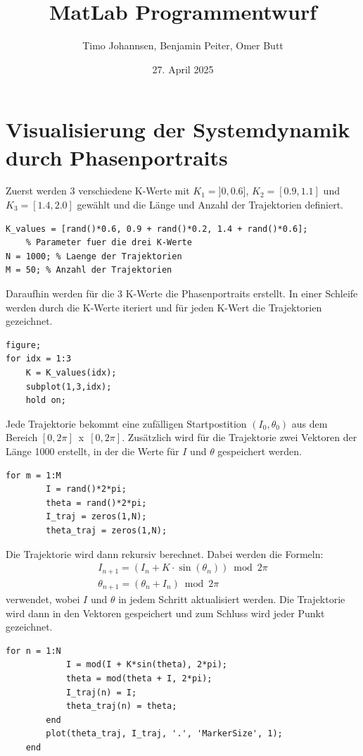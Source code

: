 \documentclass[paper=a4, 
                DIV=12]{scrartcl}
\title{MatLab Programmentwurf}
\author{Timo Johannsen, Benjamin Peiter, Omer Butt}
\date{27. April 2025}
\begin{document}
\maketitle
\newpage
\tableofcontents
\newpage

\section{Visualisierung der Systemdynamik durch Phasenportraits}
Zuerst werden 3 verschiedene K-Werte mit $K_{1} = ]0,0.6]$, $K_{2} = [0.9,1.1]$ und \hbox{$K_{3} = [1.4,2.0]$} gewählt und die Länge und Anzahl der Trajektorien definiert. 
\begin{lstlisting}[frame=single, style=Matlab-editor]
K_values = [rand()*0.6, 0.9 + rand()*0.2, 1.4 + rand()*0.6];
    % Parameter fuer die drei K-Werte
N = 1000; % Laenge der Trajektorien
M = 50; % Anzahl der Trajektorien
\end{lstlisting}
Daraufhin werden für die 3 K-Werte die Phasenportraits erstellt. In einer Schleife werden durch die K-Werte iteriert und für jeden K-Wert die Trajektorien gezeichnet.
\begin{lstlisting}[frame=single, style=Matlab-editor]
figure;
for idx = 1:3
    K = K_values(idx);
    subplot(1,3,idx);
    hold on;
\end{lstlisting}
Jede Trajektorie bekommt eine zufälligen Startpostition $(I_0, \theta_0)$ aus dem Bereich \hbox{$[0,2\pi]$ x $[0,2\pi]$}.
Zusätzlich wird für die Trajektorie zwei Vektoren der Länge 1000 erstellt, in der die Werte für $I$ und $\theta$ gespeichert werden.
\begin{lstlisting}[frame=single, style=Matlab-editor]
    for m = 1:M
        I = rand()*2*pi;
        theta = rand()*2*pi;
        I_traj = zeros(1,N);
        theta_traj = zeros(1,N);
\end{lstlisting}
Die Trajektorie wird dann rekursiv berechnet. Dabei werden die Formeln:
\begin{gather*}
    I_{n+1} = (I_n + K \cdot \sin(\theta_n)) \bmod 2\pi \\
    \theta_{n+1} = (\theta_n + I_n) \bmod 2\pi
\end{gather*}
verwendet, wobei $I$ und $\theta$ in jedem Schritt aktualisiert werden. Die Trajektorie wird dann in den Vektoren gespeichert und zum Schluss wird jeder Punkt gezeichnet.
\begin{lstlisting}[frame=single, style=Matlab-editor]
        for n = 1:N
            I = mod(I + K*sin(theta), 2*pi);
            theta = mod(theta + I, 2*pi);
            I_traj(n) = I;
            theta_traj(n) = theta;
        end
        plot(theta_traj, I_traj, '.', 'MarkerSize', 1);
    end
\end{lstlisting}
\end{document}
